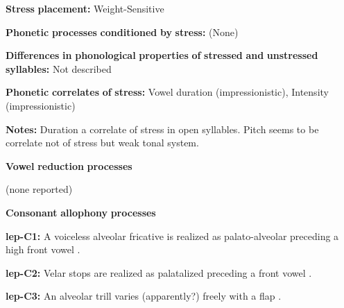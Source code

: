\documentclass[output=paper]{langsci/langscibook}
\begin{document}
\begin{styleBody}
\textbf{Stress} \textbf{placement:} Weight-Sensitive
\end{styleBody}

\begin{styleBody}
\textbf{Phonetic} \textbf{processes} \textbf{conditioned} \textbf{by} \textbf{stress:} (None)
\end{styleBody}

\begin{styleBody}
\textbf{Differences} \textbf{in} \textbf{phonological} \textbf{properties} \textbf{of} \textbf{stressed} \textbf{and} \textbf{unstressed} \textbf{syllables:} Not described
\end{styleBody}

\begin{styleBody}
\textbf{Phonetic} \textbf{correlates} \textbf{of} \textbf{stress:} Vowel duration (impressionistic), Intensity (impressionistic)
\end{styleBody}

\begin{styleBody}
\textbf{Notes:} Duration a correlate of stress in open syllables. Pitch seems to be correlate not of stress but weak tonal system.
\end{styleBody}

\begin{styleBody}
\textbf{Vowel} \textbf{reduction} \textbf{processes}
\end{styleBody}

\begin{styleBody}
(none reported)
\end{styleBody}

\begin{styleBody}
\textbf{Consonant} \textbf{allophony} \textbf{processes}
\end{styleBody}

\begin{styleBody}
\textbf{lep-C1:} A voiceless alveolar fricative is realized as palato-alveolar preceding a high front vowel \citep[27]{Plaisier2007}.
\end{styleBody}

\begin{styleBody}
\textbf{lep-C2:} Velar stops are realized as palatalized preceding a front vowel \citep[21]{Plaisier2007}.
\end{styleBody}

\begin{styleBody}
\textbf{lep-C3:} An alveolar trill varies (apparently?) freely with a flap \citep[28]{Plaisier2007}.
\end{styleBody}
\end{document}
